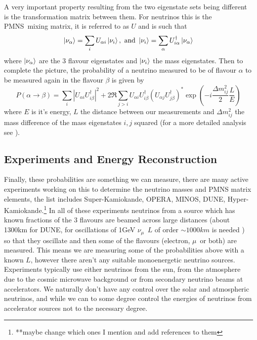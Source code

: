 \documentclass[a4paper,12pt]{article}
\newcommand{\Mu}{$\mu$}
\newcommand{\Nm}{$\nu_\mu$}
\begin{document}
A very important property resulting from the two eigenstate sets being different is the transformation matrix between them.
For neutrinos this is the PMNS\footnotemark\ mixing matrix, it is referred to as $U$ and is such that 
\begin{equation}
    \ket{\nu_\alpha} = \sum_i U_{\alpha i} \ket{\nu_i}, \text{ and }
    \ket{\nu_i} = \sum_\alpha U^\dag_{i \alpha} \ket{\nu_\alpha}
\end{equation}
where $\ket{\nu_\alpha}$ are the 3 flavour eigenstates and $\ket{\nu_i}$ the mass eigenstates.
Then to complete the picture, the probability of a neutrino measured to be of flavour $\alpha$ to be measured again in the flavour $\beta$ is given by 
\begin{equation}
    P(\alpha \rightarrow \beta) = \sum_i |U_{\alpha i} U^\dag_{i \beta}|^2 + 2\Re \sum_{j>i} U_{\alpha i} U^\dag_{i \beta} (U_{\alpha j} U^\dag_{j \beta})^* \exp(-i\frac{\Delta m^2_{ij}}{2}\frac{L}{E})
\end{equation}
where $E$ is it's energy, $L$ the distance between our measurements and $\Delta m^2_{ij}$ the mass difference of the mass eigenstates $i, j$ squared (for a more detailed analysis see \cite{zuberNeutrinoPhysics2020}).

\subsection{Experiments and Energy Reconstruction}
Finally, these probabilities are something we can measure, there are many active experiments working on this to determine the neutrino masses and PMNS matrix elements, the list includes Super-Kamiokande, OPERA, MINOS, DUNE, Hyper-Kamiokande.\footnote{**maybe change which ones I mention and add references to them}
In all of these experiments neutrinos from a source which has known fractions of the 3 flavours are beamed across large distances (about 1300\si{km} for DUNE, for oscillations of 1\si{GeV} \Nm\ $L$ of order $\sim 1000\si{km}$ is needed \cite{mezzettoThreeFlavorOscillationsAccelerator2020}) so that they oscillate and then some of the flavours (electron, \Mu\ or both) are measured.
This means we are measuring some of the probabilities above with a known $L$, however there aren't any suitable monoenergetic neutrino sources.
Experiments typically use either neutrinos from the sun, from the atmosphere due to the cosmic microwave background or from secondary neutrino beams at accelerators.
We naturally don't have any control over the solar and atmospheric neutrinos, and while we can to some degree control the energies of neutrinos from accelerator sources not to the necessary degree.
\end{document}
